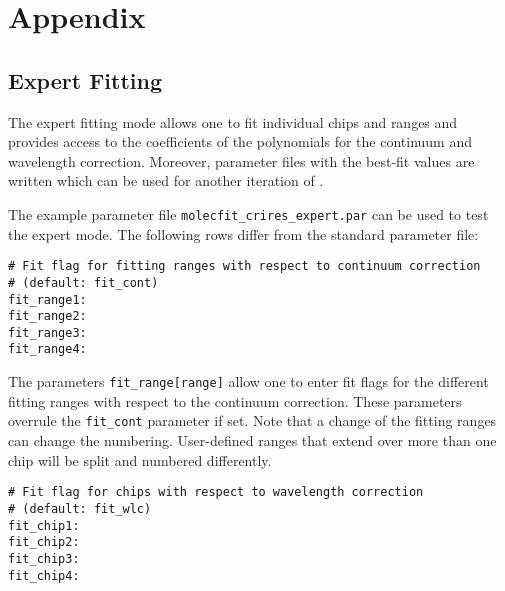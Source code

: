 \section{Appendix}\label{app:appendix}
\subsection{Expert Fitting}\label{app:expertfit}
The expert fitting mode allows one to fit individual chips and ranges and
provides access to the coefficients of the polynomials for the continuum and
wavelength correction.
Moreover, parameter files with the best-fit values are written
which can be used for another iteration of \mf.

The example parameter file {\tt molecfit\_crires\_expert.par} can be used to
test the expert mode. The following rows differ from the standard parameter
file:



\begin{verbatim}
# Fit flag for fitting ranges with respect to continuum correction
# (default: fit_cont)
fit_range1:
fit_range2:
fit_range3:
fit_range4:
\end{verbatim}

The parameters {\tt fit\_range[range]} allow one to enter fit flags for the
different fitting ranges with respect to the continuum correction. These
parameters overrule the {\tt fit\_cont} parameter if set. Note that a change of
the fitting ranges can change the numbering. User-defined ranges that extend
over more than one chip will be split and numbered differently.

\begin{verbatim}
# Fit flag for chips with respect to wavelength correction
# (default: fit_wlc)
fit_chip1:
fit_chip2:
fit_chip3:
fit_chip4:
\end{verbatim}

